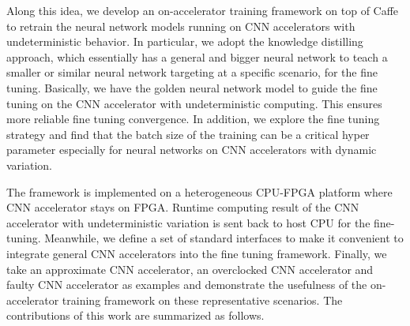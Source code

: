 Along this idea, we develop an on-accelerator training framework 
on top of Caffe to retrain the neural network models 
running on CNN accelerators with undeterministic behavior. 
In particular, we adopt the knowledge 
distilling approach\cite{distillation_38,distillation_39}, which essentially has a general and bigger
neural network to teach a smaller or similar neural network 
targeting at a specific scenario, for the fine tuning. 
Basically, we have the golden neural network model 
to guide the fine tuning on the CNN accelerator with undeterministic 
computing. This ensures more reliable fine tuning convergence.  
In addition, we explore the fine tuning strategy and find 
that the batch size of the training can be a critical hyper parameter 
especially for neural networks on CNN accelerators with dynamic variation. 

The framework is implemented on a heterogeneous CPU-FPGA platform where 
CNN accelerator stays on FPGA. Runtime computing result of the 
CNN accelerator with undeterministic variation is sent back to 
host CPU for the fine-tuning. Meanwhile, we define a set of standard 
interfaces to make it convenient to integrate general CNN accelerators 
into the fine tuning framework. Finally, we take an approximate CNN accelerator,
an overclocked CNN accelerator and faulty CNN accelerator as examples 
and demonstrate the usefulness of the on-accelerator training framework on 
these representative scenarios. The contributions of this work are 
summarized as follows.

